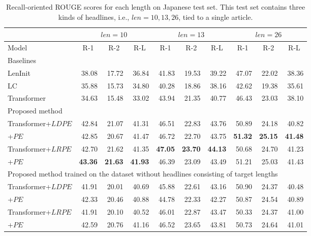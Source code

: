 \documentclass[11pt,a4paper]{article}
\begin{document}
\begin{table}[!t]
  \centering
  \footnotesize
  \begin{tabular}{| l | r r r | r r r | r r r |} \hline
  & \multicolumn{3}{|c|}{$len = 10$} & \multicolumn{3}{c|}{$len = 13$} & \multicolumn{3}{c|}{$len = 26$} \\ \hline
  Model & \multicolumn{1}{c}{R-1} & \multicolumn{1}{c}{R-2} & \multicolumn{1}{c|}{R-L} & \multicolumn{1}{c}{R-1} & \multicolumn{1}{c}{R-2} & \multicolumn{1}{c|}{R-L} & \multicolumn{1}{c}{R-1} & \multicolumn{1}{c}{R-2} & \multicolumn{1}{c|}{R-L} \\ \hline
  \multicolumn{10}{|l|}{Baselines} \\ \hline
  LenInit & 38.08 & 17.72 & 36.84 & 41.83 & 19.53 & 39.22 & 47.07 & 22.02 & 38.36 \\
  LC & 35.88 & 15.73 & 34.80 & 40.28 & 18.86 & 38.16 & 42.62 & 19.38 & 35.61 \\
  Transformer & 34.63 & 15.48 & 33.02 & 43.94 & 21.35 & 40.77 & 46.43 & 23.03 & 38.10 \\ \hline
  \multicolumn{10}{|l|}{Proposed method} \\ \hline
  Transformer+$LDPE$ & 42.84 & 21.07 & 41.31 & 46.51 & 22.83 & 43.76 & 50.89 & 24.18 & 40.82 \\
  +$PE$ & 42.85 & 20.67 & 41.47 & 46.72 & 22.70 & 43.75 & {\bf 51.32} & {\bf 25.15} & {\bf 41.48} \\
  Transformer+$LRPE$ & 42.70 & 21.62 & 41.35 & {\bf 47.05} & {\bf 23.70} & {\bf 44.13} & 50.68 & 24.70 & 41.23 \\
  +$PE$ & {\bf 43.36} & {\bf 21.63} & {\bf 41.93} & 46.39 & 23.09 & 43.49 & 51.21 & 25.03 & 41.43 \\ \hline
  \multicolumn{10}{|l|}{Proposed method trained on the dataset without headlines consisting of target lengths} \\ \hline
  Transformer+$LDPE$ & 41.91 & 20.01 & 40.69 & 45.88 & 22.61 & 43.16 & 50.90 & 24.37 & 40.48 \\
  +$PE$ & 42.33 & 20.46 & 40.88 & 44.78 & 22.33 & 42.27 & 50.87 & 24.54 & 40.89 \\
  Transformer+$LRPE$ & 41.91 & 20.10 & 40.52 & 46.01 & 22.87 & 43.47 & 50.33 & 24.37 & 41.00 \\
  +$PE$ & 42.59 & 20.76 & 41.16 & 46.52 & 23.65 & 43.81 & 50.73 & 24.64 & 41.01 \\ \hline
  \end{tabular}
  \caption{Recall-oriented ROUGE scores for each length on Japanese test set. This test set contains three kinds of headlines, i.e., $len=10, 13, 26$, tied to a single article.\label{tab:jamul_result}}
\end{table}
\end{document}
